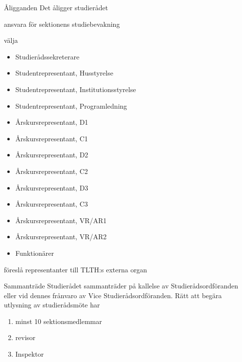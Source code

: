 \documentclass[pdfbookmarks,a4paper,11pt]{article}
\newlength{\itemcollength}
\newenvironment{reglemlista}{%
  \begin{list}{}{%
      \setlength{\labelwidth}{\itemcollength}%
      \setlength{\leftmargin}{\labelwidth + \labelsep}%
      \renewcommand{\makelabel}[1]{%
        \raisebox{0pt}[1ex][0pt]{%
          \makebox[\labelwidth][l]{%
            \parbox[t]{\itemcollength}{%
              \raggedright\hspace{0pt}##1}}}\hfill}%
      }}{%
  \end{list}}
\begin{document}
\begin{reglemlista}

	\item[Åligganden]
	Det åligger studierådet
	\begin{attlista}
		\item ansvara för sektionens studiebevakning
		\item välja
		\begin{itemize}
			\item Studierådssekreterare
			\item Studentrepresentant, Husstyrelse
			\item Studentrepresentant, Institutionsstyrelse
			\item Studentrepresentant, Programledning
			\item Årskursrepresentant, D1
			\item Årskursrepresentant, C1
			\item Årskursrepresentant, D2
			\item Årskursrepresentant, C2
			\item Årskursrepresentant, D3
			\item Årskursrepresentant, C3
			\item Årskursrepresentant, VR/AR1
			\item Årskursrepresentant, VR/AR2
			\item Funktionärer
		\end{itemize}
		
		\item föreslå representanter till TLTH:s externa organ
	\end{attlista}

	\item[Sammanträde]
	Studierådet sammanträder på kallelse av Studierådsordföranden eller vid
	dennes frånvaro av Vice Studierådsordföranden. Rätt att begära utlysning av
	studierådsmöte har
	\begin{enumerate}
		\item minst 10 sektionsmedlemmar
		\item revisor
		\item Inspektor
	\end{enumerate}
	

\end{reglemlista}
\end{document}
